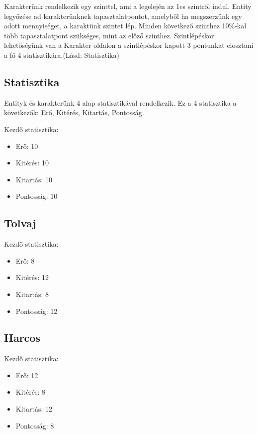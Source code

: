 Karakterünk rendelkezik egy szinttel, ami a legelején az 1es szintről indul.
Entity legyőzése ad karakterünknek tapasztalatpontot, amelyből ha megszerzünk egy adott mennyiséget, a karaktünk szintet lép.
Minden következő szinthez 10\%-kal több tapasztalatpont szükséges, mint az előző szinthez.
Szintlépéskor lehetőségünk van a Karakter oldalon a szintlépéskor kapott 3 pontunkat elosztani a fő 4 statisztikára.(Lásd: Statisztika)

\subsection{Statisztika}

Entityk és karakterünk 4 alap statisztikával rendelkezik.
Ez a 4 statisztika a következők: Erő, Kitérés, Kitartás, Pontosság.

Kezdő statisztika:
\begin{itemize}
    \item Erő: 10
    \item Kitérés: 10
    \item Kitartás: 10
    \item Pontosság: 10
\end{itemize}


\subsection{Tolvaj}

Kezdő statisztika:
\begin{itemize}
    \item Erő: 8
    \item Kitérés: 12
    \item Kitartás: 8
    \item Pontosság: 12
\end{itemize}

\subsection{Harcos}

Kezdő statisztika:
\begin{itemize}
    \item Erő: 12
    \item Kitérés: 8
    \item Kitartás: 12
    \item Pontosság: 8
\end{itemize}

